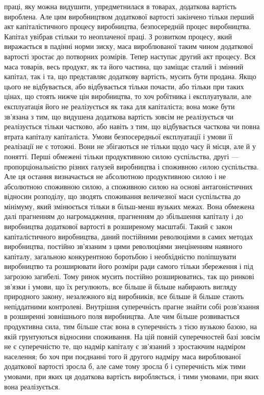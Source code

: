 праці, яку можна видушити, упредметнилася в товарах, додаткова
вартість вироблена. Але цим виробництвом додаткової
вартості закінчено тільки перший акт капіталістичного процесу
виробництва, безпосередній процес виробництва. Капітал увібрав
стільки то неоплаченої праці. З розвитком процесу, який виражається
в падінні норми зиску, маса вироблюваної таким чином
додаткової вартості зростає до потворних розмірів. Тепер
наступає другий акт процесу. Вся маса товарів, весь продукт,
як та його частина, що заміщає сталий і змінний капітал, так
і та, що представляє додаткову вартість, мусить бути продана.
Якщо цього не відбувається, або відбувається тільки почасти,
або тільки при таких цінах, що стоять нижче цін виробництва,
то хоч робітника і експлуатували, але експлуатація його не
реалізується як така для капіталіста; вона може бути зв’язана
з тим, що видушена додаткова вартість зовсім не реалізується чи
реалізується тільки частково, або навіть з тим, що відбувається
часткова чи повна втрата капіталу капіталіста. Умови безпосередньої
експлуатації і умови її реалізації не є тотожні. Вони не
збігаються не тільки щодо часу й місця, але й у понятті. Перші
обмежені тільки продуктивною силою суспільства, другі — пропорціональністю
різних галузей виробництва і споживною cилою
суспільства. Але ця остання визначається не абсолютною продуктивною
силою і не абсолютною споживною силою, а споживною
силою на основі антагоністичних відносин розподілу,
що зводять споживання величезної маси суспільства до мінімуму,
який змінюється тільки в більш-менш вузьких межах.
Вона обмежена далі прагненням до нагромадження, прагненням
до збільшення капіталу і до виробництва додаткової вартості
в розширеному масштабі. Такий є закон капіталістичного виробництва,
даний постійними революціями в самих методах виробництва,
постійно зв’язаним з цими революціями знеціненням
наявного капіталу, загальною конкурентною боротьбою і необхідністю
поліпшувати виробництво та розширювати його розміри
ради самого тільки збереження і під загрозою загибелі. Тому ринок
мусить постійно розширюватись, так що ринкові зв’язки і
умови, що їх регулюють, все більше й більше набирають
вигляду природного закону, незалежного від виробників, все
більше й більше стають непіддатними контролеві. Внутрішня
суперечність прагне знайти собі розв’язання в розширенні зовнішнього
поля виробництва. Але чим більше розвивається продуктивна
сила, тим більше стає вона в суперечність з тією
вузькою базою, на якій грунтуються відносини споживання. На
цій повній суперечностей базі зовсім не є суперечністю те,
що надмір капіталу є зв’язаний з зростаючим надміром населення;
бо хоч при поєднанні того й другого надміру маса вироблюваної
додаткової вартості зросла б, але саме тому зросла б
і суперечність між тими умовами, при яких ця додаткова вартість
виробляється, і тими умовами, при яких вона реалізується.
